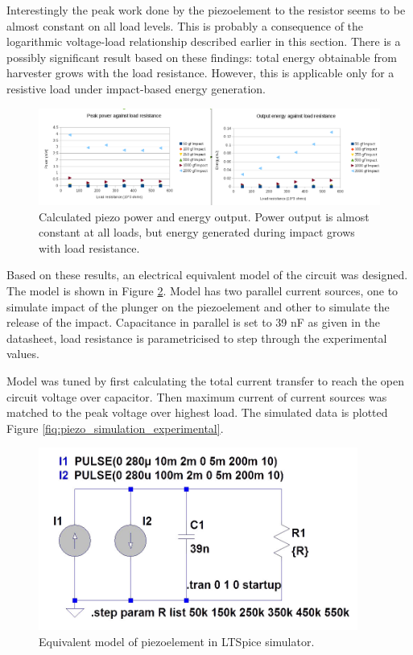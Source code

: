  Interestingly the peak work done by the piezoelement to the resistor seems to be almost constant on all load levels. This is probably a consequence of the logarithmic voltage-load relationship described earlier in this section. There is a possibly significant result based on these findings: total energy obtainable from harvester grows with the load resistance. However, this is applicable only for a resistive load under impact-based energy generation.
 
 \begin{figure}[htb]
  \begin{center}
  \includegraphics[width=\columnwidth]{images/own_measurement/piezo_power}
  \end{center}
  \caption{Calculated piezo power and energy output. Power output is almost constant at all loads, but energy generated during impact grows with load resistance.}
  \label{fig:piezo_power_energy}
\end{figure}

Based on these results, an electrical equivalent model of the circuit was designed. The model is shown in Figure \ref{fig:piezo_ltspice_equivalent}. Model has two parallel current sources, one to simulate impact of the plunger on the piezoelement and other to simulate the release of the impact. Capacitance in parallel is set to 39 nF as given in the datasheet, load resistance is parametricised to step through the experimental values.

Model was tuned by first calculating the total current transfer to reach the open circuit voltage over capacitor. Then maximum current of current sources was matched to the peak voltage over highest load.
The simulated data is plotted Figure \ref{fiq:piezo_simulation_experimental}.

 \begin{figure}[htb]
  \begin{center}
  \includegraphics[height=6cm]{images/own_dwg/ltspice_piezo}
  \end{center}
  \caption{Equivalent model of piezoelement in LTSpice simulator.}
  \label{fig:piezo_ltspice_equivalent}
\end{figure}


